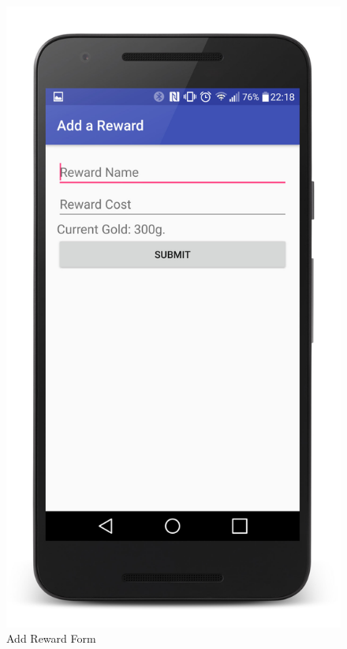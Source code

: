 \begin{figure}[ht]
\begin{minipage}[b]{0.45\linewidth}
    \includegraphics[width=.8\linewidth]{../images/Screenshot/AddRewardScreen.jpg}
    \caption{Add Reward Form} 
    \vspace{4ex}
  \end{minipage}%
  \begin{minipage}[b]{0.45\linewidth}
    \centering

\end{minipage}
\end{figure}

